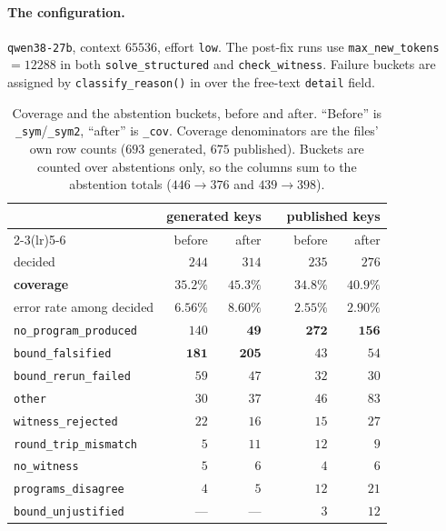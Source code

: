 \begin{sloppypar}
\paragraph{The configuration.} \texttt{qwen38-27b}, context $65536$, effort \texttt{low}. The
post-fix runs use \texttt{max\_new\_tokens}$=12288$ in both \texttt{solve\_structured} and
\texttt{check\_witness}. Failure buckets are assigned by \texttt{classify\_reason()} in
 over the free-text \texttt{detail} field.
\end{sloppypar}

\begin{table}[t]
\centering\small
\caption{Coverage and the abstention buckets, before and after. ``Before'' is
\texttt{\_sym}/\texttt{\_sym2}, ``after'' is \texttt{\_cov}. Coverage denominators are the
files' own row counts ($693$ generated, $675$ published). Buckets are counted over abstentions
only, so the columns sum to the abstention totals ($446 \to 376$ and $439 \to 398$).}
\label{tab:coverage}
\begin{tabular}{lrrcrr}
\toprule
& \multicolumn{2}{c}{generated keys} & & \multicolumn{2}{c}{published keys} \\
\cmidrule(lr){2-3}\cmidrule(lr){5-6}
& before & after & & before & after \\
\midrule
decided                        & $244$ & $314$ & & $235$ & $276$ \\
\textbf{coverage}              & $\mathbf{35.2\%}$ & $\mathbf{45.3\%}$ & & $\mathbf{34.8\%}$ & $\mathbf{40.9\%}$ \\
error rate among decided       & $6.56\%$ & $8.60\%$ & & $2.55\%$ & $2.90\%$ \\
\midrule
\texttt{no\_program\_produced}  & $140$ & $\mathbf{49}$  & & $\mathbf{272}$ & $\mathbf{156}$ \\
\texttt{bound\_falsified}       & $\mathbf{181}$ & $\mathbf{205}$ & & $43$  & $54$ \\
\texttt{bound\_rerun\_failed}   & $59$  & $47$  & & $32$  & $30$ \\
\texttt{other}                  & $30$  & $37$  & & $46$  & $83$ \\
\texttt{witness\_rejected}      & $22$  & $16$  & & $15$  & $27$ \\
\texttt{round\_trip\_mismatch}  & $5$   & $11$  & & $12$  & $9$ \\
\texttt{no\_witness}            & $5$   & $6$   & & $4$   & $6$ \\
\texttt{programs\_disagree}     & $4$   & $5$   & & $12$  & $21$ \\
\texttt{bound\_unjustified}     & ---   & ---   & & $3$   & $12$ \\
\bottomrule
\end{tabular}
\end{table}


